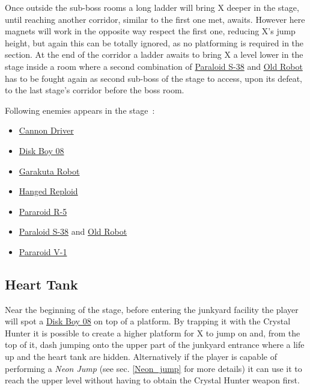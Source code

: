 Once outside the sub-boss rooms a long ladder will bring X deeper in the stage, until reaching another corridor, similar to the first one met, awaits. However here magnets will work in the opposite way respect the first one, reducing X's jump height, but again this can be totally ignored, as no platforming is required in the section. At the end of the corridor a ladder awaits to bring X a level lower in the stage inside a room where a second combination of  \hyperlink{miniboss:Paraloid_S-38}{Paraloid S-38} and \hyperlink{miniboss:Old_robot}{Old Robot} has to be fought again as second sub-boss of the stage to access, upon its defeat, to the last stage's corridor before the boss room.

Following enemies appears in the stage~\cite{wiki:Robot_Junkyard}:
\begin{itemize}
	
	\item \hyperlink {enem:Cannon_Driver}{Cannon Driver}
	\item \hyperlink {enem:Disk_Boy_08}{Disk Boy 08}
	\item \hyperlink {enem:Garakuta_Robot}{Garakuta Robot} 
	\item \hyperlink {enem:Hanged_Reploid}{Hanged Reploid}
	\item \hyperlink {enem:Pararoid_R-5}{Pararoid R-5}
	\item \hyperlink {miniboss:Paraloid_S-38}{Paraloid S-38} and \hyperlink{miniboss:Old_robot}{Old Robot}
	\item \hyperlink {enem:Pararoid_V-1}{Pararoid V-1}
\end{itemize}


\subsection{Heart Tank}
Near the beginning of the stage, before entering the junkyard facility the player will spot a \hyperlink {enem:Disk_Boy_08}{Disk Boy 08} on top of a platform. By trapping it with the Crystal Hunter it is possible to create a higher platform for X to jump on and, from the top of it, dash jumping onto the upper part of the junkyard entrance where a life up and the heart tank are hidden. Alternatively if the player is capable of performing a \emph{Neon Jump} (see sec. \ref{Neon_jump} for more details) it can use it to reach the upper level without having to obtain the Crystal Hunter weapon first.

